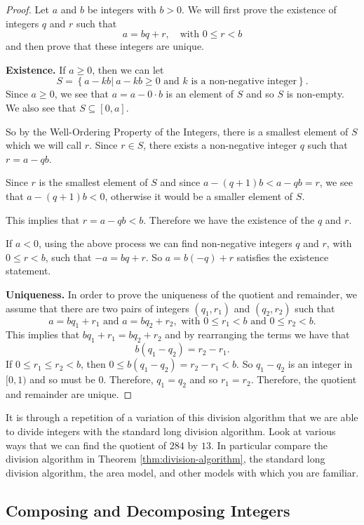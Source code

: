 \documentclass[
]{book}
\theoremstyle{definition}
\theoremstyle{definition}
\theoremstyle{definition}
\theoremstyle{remark}
\begin{document}
\begin{proof}
{}Let \(a\) and \(b\) be integers with \(b>0\). We will first prove the existence of integers \(q\) and \(r\) such that \[a=bq+r, \quad \mbox{with } 0\leq r <b\] and then prove that these integers are unique.

\textbf{Existence.} If \(a\geq 0\), then we can let
\[S= \left\{ a-kb \vert  \: a-kb\geq 0 \mbox{ and $k$ is a non-negative integer}\right\}.\]
Since \(a\geq 0\), we see that \(a=a-0\cdot b\) is an element of \(S\) and so \(S\) is non-empty. We also see that \(S \subseteq [0,a]\).

So by the Well-Ordering Property of the Integers, there is a smallest element of \(S\) which we will call \(r\). Since \(r\in S\), there exists a non-negative integer \(q\) such that \(r=a-qb\).

Since \(r\) is the smallest element of \(S\) and since \(a-(q+1)b<a-qb=r\), we see that \(a-(q+1)b<0\), otherwise it would be a smaller element of \(S\).

This implies that \(r=a-qb<b\). Therefore we have the existence of the \(q\) and \(r\).

If \(a<0\), using the above process we can find non-negative integers \(q\) and \(r\), with \(0\leq r<b\), such that \(-a=bq+r\). So \(a=b(-q)+r\) satisfies the existence statement.

\textbf{Uniqueness.} In order to prove the uniqueness of the quotient and remainder, we assume that there are two pairs of integers \((q_1,r_1)\) and \((q_2,r_2)\) such that
\[a= b q_1 + r_1 \mbox{ and } a= b q_2 + r_2, \mbox{ with } 0\leq r_1<b \mbox{ and } 0\leq r_2 <b.\]
This implies that \(b q_1 + r_1 = b q_2 + r_2\) and by rearranging the terms we have that \[b (q_1 - q_2) = r_2-r_1.\] If \(0 \leq r_1 \leq r_2<b\), then \(0 \leq b(q_1-q_2)=r_2-r_1<b\). So \(q_1-q_2\) is an integer in \([0,1)\) and so must be \(0\). Therefore, \(q_1=q_2\) and so \(r_1=r_2\). Therefore, the quotient and remainder are unique.
\end{proof}

It is through a repetition of a variation of this division algorithm that we are able to divide integers with the standard long division algorithm. Look at various ways that we can find the quotient of \(284\) by \(13\). In particular compare the division algorithm in Theorem \ref{thm:division-algorithm}, the standard long division algorithm, the area model, and other models with which you are familiar.

\hypertarget{composing-and-decomposing-integers}{%
\subsection{Composing and Decomposing Integers}\label{composing-and-decomposing-integers}}
\end{document}
